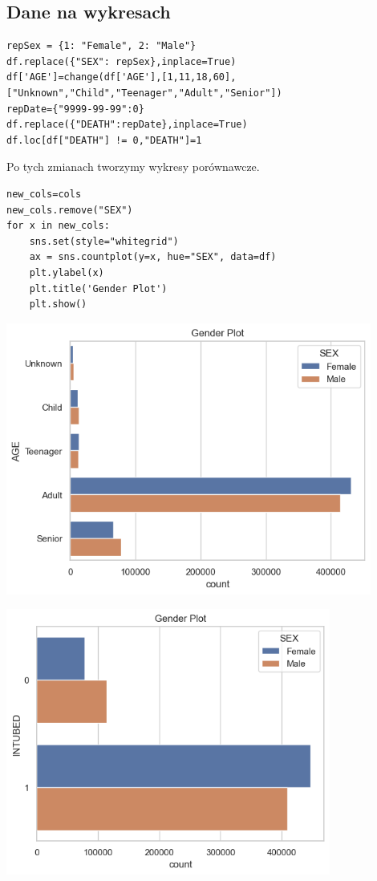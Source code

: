 \documentclass{article}
\begin{document}
{\subsection{Dane na wykresach}
\begin{lstlisting}
repSex = {1: "Female", 2: "Male"}
df.replace({"SEX": repSex},inplace=True)
df['AGE']=change(df['AGE'],[1,11,18,60],["Unknown","Child","Teenager","Adult","Senior"])
repDate={"9999-99-99":0}
df.replace({"DEATH":repDate},inplace=True)
df.loc[df["DEATH"] != 0,"DEATH"]=1
\end{lstlisting}
\newline
\large{Po tych zmianach tworzymy wykresy porównawcze.}
\begin{lstlisting}
new_cols=cols
new_cols.remove("SEX")
for x in new_cols:
    sns.set(style="whitegrid")
    ax = sns.countplot(y=x, hue="SEX", data=df)
    plt.ylabel(x)
    plt.title('Gender Plot')
    plt.show()
\end{lstlisting}
\begin{center}
    \includegraphics[width=0.9\textwidth]{image6.png}\newline
\end{center}
\begin{center}
    \includegraphics[width=0.8\textwidth]{image5.png}\newline

\end{center}}
\end{document}
